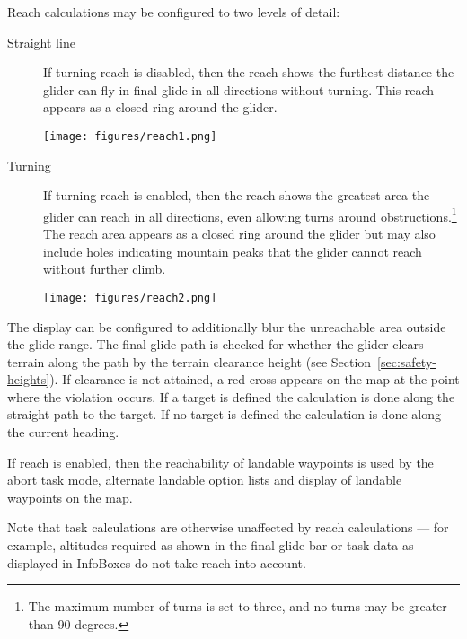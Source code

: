 Reach calculations may be configured  to two levels of detail:
\begin{description}
\item[Straight line] If turning reach is disabled, then the reach shows the
 furthest distance the glider can fly in final glide in all directions without
 turning.  This reach appears as a closed ring around the glider.

\begin{center}
\texttt{[image: figures/reach1.png]}
\end{center}

\item[Turning] If turning reach is enabled, then the reach shows the
  greatest area the glider can reach in all directions, even allowing
  turns around obstructions.\footnote{The maximum number of turns is
    set to three, and no turns may be greater than 90 degrees.}  The
  reach area appears as a closed ring around the glider but may also
  include holes indicating mountain peaks that the glider cannot reach
  without further climb.

\begin{center}
\texttt{[image: figures/reach2.png]}
\end{center}

\end{description}

The display can be configured to additionally blur the unreachable area
outside the glide range. 
The final glide path is checked for whether the glider clears terrain along
the path by the terrain clearance height (see Section~\ref{sec:safety-heights}).
If clearance is not attained, a red
cross appears on the map at the point where the violation occurs. If a target is
defined the calculation is done along the straight path to the target. If no 
target is defined the calculation is done along the current heading.

If reach is enabled, then the reachability of landable waypoints is used
by the abort task mode, alternate landable option lists and display of
landable waypoints on the map.

Note that task calculations are otherwise unaffected by reach
calculations --- for example, altitudes required as shown in the final
glide bar or task data as displayed in InfoBoxes do not take reach into account.

